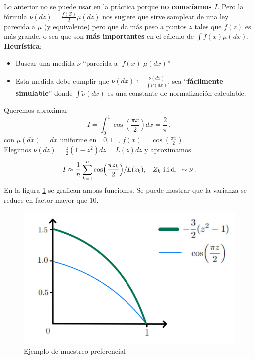 \newp Lo anterior no se puede usar en la práctica porque \textbf{no conocíamos $I$}. Pero la fórmula $\nu(dz)=\frac{f(Z)}{I}\mu(dz)$ nos sugiere que sirve samplear de una ley parecida a $\mu$ (y equivalente) pero que da más peso a puntos $z$ tales que $f(z)$ es más grande, o sea que son \textbf{más importantes} en el cálculo de $\int f(x)\mu(dx)$.
\newp \textbf{Heurística}:
\begin{itemize}
    \item Buscar una medida $\tilde{\nu}$ ``parecida a $|f(x)|\mu(dx)$''
    \item Esta medida debe cumplir que $\nu(dx):=\displaystyle\frac{\tilde\nu(dx)}{\int\tilde{\nu}(dx)}$, sea ``\textbf{fácilmente simulable}'' donde $\int\tilde{\nu}(dx)$ es una constante de normalización calculable. 
\end{itemize}
\begin{example}
Queremos aproximar $$I=\displaystyle\int^1_0\cos(\frac{\pi x}{2})dx=\frac{2}{\pi} \, ,$$ con $\mu(dx)=dx$ uniforme en $[0,1]$, $f(x)=\cos(\frac{\pi x}{2})$.\\
\newline Elegimos $\nu(dz)=\frac{z}{2}(1-z^2)dz=L(z)dz$ y aproximamos
$$ I\approx\displaystyle\frac{1}{n}\sum^n_{k=1}\cos(\frac{\pi z_k}{2})/L(z_k), \hspace{.25cm}\, Z_k \mbox{ i.i.d. } \sim \nu \, .$$
En la figura \ref{fig:pref} se grafican ambas funciones. Se puede mostrar que la varianza se reduce en factor mayor que $10$.
\begin{figure}
    \centering
    \includegraphics[scale=0.11]{img/clase_08_pag_11.jpg}
    \caption{Ejemplo de muestreo preferencial}
    \label{fig:pref}
\end{figure}
\end{example}

